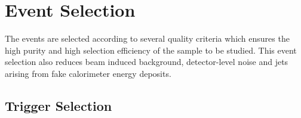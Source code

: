\section{Event Selection}
The events are selected according to several quality criteria which ensures the high purity and high selection efficiency of the sample to be studied. This event selection also reduces beam induced background, detector-level noise and jets arising from fake calorimeter energy deposits. 

\subsection{Trigger Selection}

